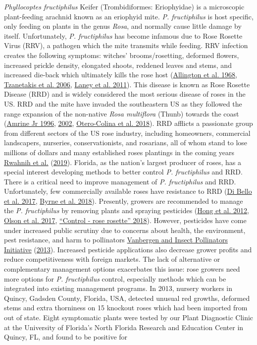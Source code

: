 \documentclass[12pt,final,CPage]{ufthesis}
\begin{document}
{  \emph{Phyllocoptes fructiphilus} Keifer (Trombidiformes: Eriophyidae) is a microscopic plant-feeding arachnid known as an eriophyid mite. \emph{P. fructiphilus} is host specific, only feeding on plants in the genus \emph{Rosa}, and normally cause little damage by itself. Unfortunately, \emph{P. fructiphilus} has become infamous due to Rose Rosette Virus (RRV), a pathogen which the mite transmits while feeding. RRV infection creates the following symptoms: witches' brooms/rosetting, deformed flowers, increased prickle density, elongated shoots, reddened leaves and stems, and increased die-back which ultimately kills the rose host (\protect\hyperlink{ref-Allington1968}{Allington et al. 1968}, \protect\hyperlink{ref-Tzanetakis2006}{Tzanetakis et al. 2006}, \protect\hyperlink{ref-Laney2011}{Laney et al. 2011}). This disease is known as Rose Rosette Disease (RRD) and is widely considered the most serious disease of roses in the US. RRD and the mite have invaded the southeastern US as they followed the range expansion of the non-native \emph{Rosa multiflora} (Thunb) towards the coast (\protect\hyperlink{ref-Amrine1996}{Amrine Jr 1996}, \protect\hyperlink{ref-Amrine2002}{2002}, \protect\hyperlink{ref-Otero-Colina2018}{Otero-Colina et al. 2018}). RRD afflicts a passionate group from different sectors of the US rose industry, including homeowners, commercial landscapers, nurseries, conservationists, and rosarians, all of whom stand to lose millions of dollars and many established roses plantings in the coming years \protect\hyperlink{ref-Rwahnih2019}{Rwahnih et al.} (\protect\hyperlink{ref-Rwahnih2019}{2019}). Florida, as the nation's largest producer of roses, has a special interest developing methods to better control \emph{P. fructiphilus} and RRD. There is a critical need to improve management of \emph{P. fructiphilus} and RRD. Unfortunately, few commercially available roses have resistance to RRD (\protect\hyperlink{ref-Bello2017}{Di Bello et al. 2017}, \protect\hyperlink{ref-Byrne2018}{Byrne et al. 2018}). Presently, growers are recommended to manage the \emph{P. fructiphilus} by removing plants and spraying pesticides (\protect\hyperlink{ref-Hong2012}{Hong et al. 2012}, \protect\hyperlink{ref-Olson2017}{Olson et al. 2017}, \protect\hyperlink{ref-UGA2018}{{``Control - rose rosette''} 2018}). However, pesticides have come under increased public scrutiny due to concerns about health, the environment, pest resistance, and harm to pollinators \protect\hyperlink{ref-Vanbergen2013}{Vanbergen and Insect Pollinators Initiative} (\protect\hyperlink{ref-Vanbergen2013}{2013}). Increased pesticide applications also decrease grower profits and reduce competitiveness with foreign markets. The lack of alternative or complementary management options exacerbates this issue: rose growers need more options for \emph{P. fructiphilus} control, especially methods which can be integrated into existing management programs. In 2013, nursery workers in Quincy, Gadsden County, Florida, USA, detected unusual red growths, deformed stems and extra thorniness on 15 knockout roses which had been imported from out of state. Eight symptomatic plants were tested by our Plant Diagnostic Clinic at the University of Florida's North Florida Research and Education Center in Quincy, FL, and found to be positive for }
\end{document}
